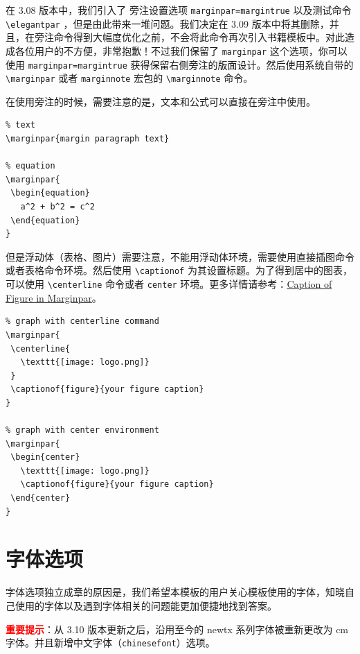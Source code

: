 \documentclass[lang=cn,newtx,10pt,scheme=chinese,pad,twocol]{zznote}
\begin{document}
在 3.08 版本中，我们引入了 旁注设置选项 \lstinline{marginpar=margintrue} 以及测试命令 \lstinline{\elegantpar} ，但是由此带来一堆问题。我们决定在 3.09 版本中将其删除，并且，在旁注命令得到大幅度优化之前，不会将此命令再次引入书籍模板中。对此造成各位用户的不方便，非常抱歉！不过我们保留了 \lstinline{marginpar} 这个选项，你可以使用 \lstinline{marginpar=margintrue} 获得保留右侧旁注的版面设计。然后使用系统自带的 \lstinline{\marginpar} 或者 \lstinline{marginnote} 宏包的 \lstinline{\marginnote} 命令。

\begin{remark}
	在使用旁注的时候，需要注意的是，文本和公式可以直接在旁注中使用。

	\begin{lstlisting}
% text
\marginpar{margin paragraph text}

% equation
\marginpar{
 \begin{equation}
   a^2 + b^2 = c^2
 \end{equation}
}
\end{lstlisting}

	但是浮动体（表格、图片）需要注意，不能用浮动体环境，需要使用直接插图命令或者表格命令环境。然后使用 \lstinline{\captionof} 为其设置标题。为了得到居中的图表，可以使用 \lstinline{\centerline} 命令或者 \lstinline{center} 环境。更多详情请参考：\href{https://tex.stackexchange.com/questions/5583/caption-of-figure-in-marginpar-and-caption-of-wrapfigure-in-margin}{Caption of Figure in Marginpar}。

	\begin{lstlisting}
% graph with centerline command
\marginpar{
 \centerline{
   \texttt{[image: logo.png]}
 }
 \captionof{figure}{your figure caption}
}

% graph with center environment
\marginpar{
 \begin{center}
   \texttt{[image: logo.png]}
   \captionof{figure}{your figure caption}
 \end{center}
}
\end{lstlisting}

\end{remark}

\chapter{字体选项}
字体选项独立成章的原因是，我们希望本模板的用户关心模板使用的字体，知晓自己使用的字体以及遇到字体相关的问题能更加便捷地找到答案。

\textcolor{red}{\bfseries 重要提示}：从 3.10 版本更新之后，沿用至今的 newtx 系列字体被重新更改为 cm 字体。并且新增中文字体（\lstinline{chinesefont}）选项。
\end{document}

